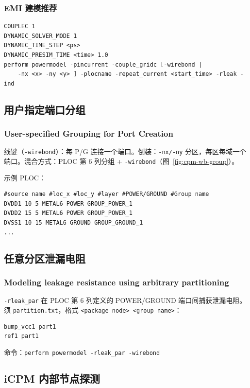 \subsubsection{EMI 建模推荐}
\begin{lstlisting}
COUPLEC 1
DYNAMIC_SOLVER_MODE 1
DYNAMIC_TIME_STEP <ps>
DYNAMIC_PRESIM_TIME <time> 1.0
perform powermodel -pincurrent -couple_gridc [-wirebond |
    -nx <x> -ny <y> ] -plocname -repeat_current <start_time> -rleak -ind
\end{lstlisting}

\subsection{用户指定端口分组}
\subsubsection*{User-specified Grouping for Port Creation}

线键（\texttt{-wirebond}）：每 P/G 连接一个端口。倒装：\texttt{-nx/-ny} 分区，每区每域一个端口。混合方式：PLOC 第 6 列分组 + \texttt{-wirebond}（图~\ref{fig:cpm-wb-group}）。


示例 PLOC：
\begin{lstlisting}
#source name #loc_x #loc_y #layer #POWER/GROUND #Group name
DVDD1 10 5 METAL6 POWER GROUP_POWER_1
DVDD2 15 5 METAL6 POWER GROUP_POWER_1
DVSS1 10 15 METAL6 GROUND GROUP_GROUND_1
...
\end{lstlisting}

\subsection{任意分区泄漏电阻}
\subsubsection*{Modeling leakage resistance using arbitrary partitioning}

\texttt{-rleak\_par} 在 PLOC 第 6 列定义的 POWER/GROUND 端口间捕获泄漏电阻。须 \texttt{partition.txt}，格式 \texttt{<package node> <group name>}：
\begin{lstlisting}
bump_vcc1 part1
ref1 part1
\end{lstlisting}
命令：\texttt{perform powermodel -rleak\_par -wirebond}

\subsection{iCPM 内部节点探测}
